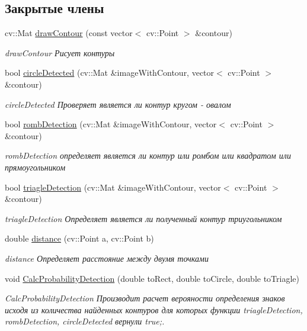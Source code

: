 \subsection*{Закрытые члены}
\begin{DoxyCompactItemize}
\item 
cv\+::\+Mat \hyperlink{class_contour_analis_a8dfbcc0a15123202d1af035f7206d87c}{draw\+Contour} (const vector$<$ cv\+::\+Point $>$ \&contour)
\begin{DoxyCompactList}\small\item\em draw\+Contour Рисует контуры \end{DoxyCompactList}\item 
bool \hyperlink{class_contour_analis_a2e67419653bf28f2bbf6766e2ffa1089}{circle\+Detected} (cv\+::\+Mat \&image\+With\+Contour, vector$<$ cv\+::\+Point $>$ \&contour)
\begin{DoxyCompactList}\small\item\em circle\+Detected Проверяет является ли контур кругом -\/ овалом \end{DoxyCompactList}\item 
bool \hyperlink{class_contour_analis_a1970e01e1762c299753c0d57f0879915}{romb\+Detection} (cv\+::\+Mat \&image\+With\+Contour, vector$<$ cv\+::\+Point $>$ \&contour)
\begin{DoxyCompactList}\small\item\em romb\+Detection определяет является ли контур или ромбом или квадратом или прямоугольником \end{DoxyCompactList}\item 
bool \hyperlink{class_contour_analis_a5c8b79c28a07825f5413cd98640d8dd2}{triagle\+Detection} (cv\+::\+Mat \&image\+With\+Contour, vector$<$ cv\+::\+Point $>$ \&contour)
\begin{DoxyCompactList}\small\item\em triagle\+Detection Определяет является ли полученный контур триугольником \end{DoxyCompactList}\item 
double \hyperlink{class_contour_analis_a4f99f88069c6a746805275d21acdf5b2}{distance} (cv\+::\+Point a, cv\+::\+Point b)
\begin{DoxyCompactList}\small\item\em distance Определяет расстояние между двумя точками \end{DoxyCompactList}\item 
void \hyperlink{class_contour_analis_a1a8b2ccb473a901f51cc21339c16c3ea}{Calc\+Probability\+Detection} (double to\+Rect, double to\+Circle, double to\+Triagle)
\begin{DoxyCompactList}\small\item\em Calc\+Probability\+Detection Производит расчет верояности определения знаков исходя из количества найденных контуров для которых функции triagle\+Detection, romb\+Detection, circle\+Detected вернули true;. \end{DoxyCompactList}\end{DoxyCompactItemize}


